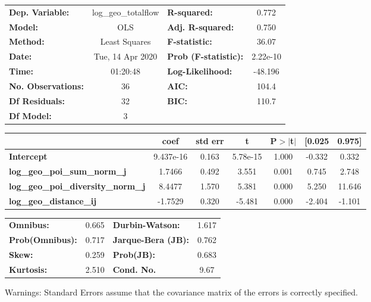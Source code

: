 \begin{center}
\begin{tabular}{lclc}
\toprule
\textbf{Dep. Variable:}                    & log\_geo\_totalflow & \textbf{  R-squared:         } &     0.772   \\
\textbf{Model:}                            &         OLS         & \textbf{  Adj. R-squared:    } &     0.750   \\
\textbf{Method:}                           &    Least Squares    & \textbf{  F-statistic:       } &     36.07   \\
\textbf{Date:}                             &   Tue, 14 Apr 2020  & \textbf{  Prob (F-statistic):} &  2.22e-10   \\
\textbf{Time:}                             &       01:20:48      & \textbf{  Log-Likelihood:    } &   -48.196   \\
\textbf{No. Observations:}                 &            36       & \textbf{  AIC:               } &     104.4   \\
\textbf{Df Residuals:}                     &            32       & \textbf{  BIC:               } &     110.7   \\
\textbf{Df Model:}                         &             3       & \textbf{                     } &             \\
\bottomrule
\end{tabular}
\begin{tabular}{lcccccc}
                                           & \textbf{coef} & \textbf{std err} & \textbf{t} & \textbf{P$> |$t$|$} & \textbf{[0.025} & \textbf{0.975]}  \\
\midrule
\textbf{Intercept}                         &    9.437e-16  &        0.163     &  5.78e-15  &         1.000        &       -0.332    &        0.332     \\
\textbf{log\_geo\_poi\_sum\_norm\_j}       &       1.7466  &        0.492     &     3.551  &         0.001        &        0.745    &        2.748     \\
\textbf{log\_geo\_poi\_diversity\_norm\_j} &       8.4477  &        1.570     &     5.381  &         0.000        &        5.250    &       11.646     \\
\textbf{log\_geo\_distance\_ij}            &      -1.7529  &        0.320     &    -5.481  &         0.000        &       -2.404    &       -1.101     \\
\bottomrule
\end{tabular}
\begin{tabular}{lclc}
\textbf{Omnibus:}       &  0.665 & \textbf{  Durbin-Watson:     } &    1.617  \\
\textbf{Prob(Omnibus):} &  0.717 & \textbf{  Jarque-Bera (JB):  } &    0.762  \\
\textbf{Skew:}          &  0.259 & \textbf{  Prob(JB):          } &    0.683  \\
\textbf{Kurtosis:}      &  2.510 & \textbf{  Cond. No.          } &     9.67  \\
\bottomrule
\end{tabular}
\end{center}

Warnings: \newline
 [1] Standard Errors assume that the covariance matrix of the errors is correctly specified.